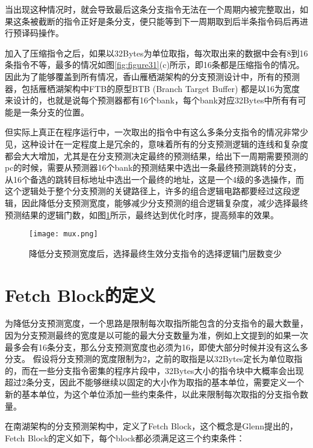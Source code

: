 当出现这种情况时，就会导致最后这条分支指令无法在一个周期内被完整取出，如果这条被截断的指令正好是条分支，便只能等到下一周期取到后半条指令码后再进行预译码操作。

加入了压缩指令之后，如果以32Bytes为单位取指，每次取出来的数据中会有8到16条指令不等，最多的情况如图\ref{fig:figure31}(c)所示，即16条都是压缩指令的情况。因此为了能够覆盖到所有情况，香山雁栖湖架构的分支预测设计中，所有的预测器，包括雁栖湖架构中FTB的原型BTB (Branch Target Buffer) 都是以16为宽度来设计的，也就是说每个预测器都有16个bank，每个bank对应32Bytes中所有有可能是一条分支的位置。

但实际上真正在程序运行中，一次取出的指令中有这么多条分支指令的情况非常少见，这种设计在一定程度上是冗余的，意味着所有的分支预测逻辑的连线和复杂度都会大大增加，尤其是在分支预测决定最终的预测结果，给出下一周期需要预测的pc的时候，需要从预测器16个bank的预测结果中选出一条最终预测跳转的分支，从16个备选的跳转目标地址中选出一个最终的地址，这是一个4级的多选操作，而这个逻辑处于整个分支预测的关键路径上，许多的组合逻辑电路都要经过这段逻辑，因此降低分支预测宽度，能够减少分支预测的组合逻辑复杂度，减少选择最终预测结果的逻辑门数，如图\ref{fig:figure33}所示，最终达到优化时序，提高频率的效果。

\begin{figure}[htb]
	\centering
	\setlength\tabcolsep{3pt}  %
	\vspace{5pt} %
	\texttt{[image: mux.png]}
	\caption{降低分支预测宽度后，选择最终生效分支指令的选择逻辑门层数变少}
	\label{fig:figure33}
\end{figure}

\section{Fetch Block的定义}

为降低分支预测宽度，一个思路是限制每次取指所能包含的分支指令的最大数量，因为分支预测最终的宽度是以可能的最大分支数量为准，例如上文提到的如果一次最多会有16条分支，那么分支预测宽度也必须为16，即使大部分时候并没有这么多分支。
假设将分支预测的宽度限制为2，之前的取指是以32Bytes定长为单位取指的，而在一些分支指令密集的程序片段中，32Bytes大小的指令块中大概率会出现超过2条分支，因此不能够继续以固定的大小作为取指的基本单位，需要定义一个新的基本单位，为这个单位添加一些约束条件，以此来限制每次取指的分支指令数量。

在南湖架构的分支预测架构中，定义了Fetch Block，这个概念是Glenn\cite{scalable-frontend}提出的，Fetch Block的定义如下，每个block都必须满足这三个约束条件：


